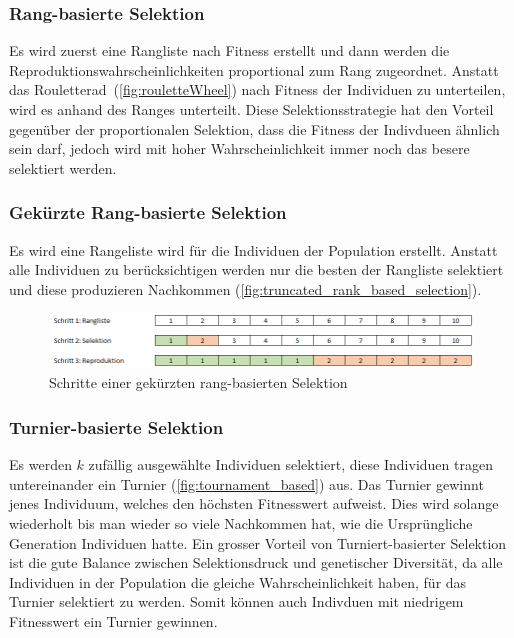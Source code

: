       \subsubsection{Rang-basierte Selektion}

        Es wird zuerst eine Rangliste nach Fitness erstellt und dann werden die Reproduktionswahrscheinlichkeiten proportional zum Rang zugeordnet.
        Anstatt das Rouletterad~(\vref{fig:rouletteWheel}) nach Fitness der Individuen zu unterteilen, wird es anhand des Ranges unterteilt.
        Diese Selektionsstrategie hat den Vorteil gegenüber der proportionalen Selektion,
        dass die Fitness der Indivdueen ähnlich sein darf, jedoch wird mit hoher Wahrscheinlichkeit immer noch das besere selektiert werden.

      \subsubsection{Gekürzte Rang-basierte Selektion}

        Es wird eine Rangeliste wird für die Individuen der Population erstellt.
        Anstatt alle Individuen zu berücksichtigen werden nur die besten der Rangliste selektiert und diese produzieren Nachkommen (\vref{fig:truncated_rank_based_selection}).

        \begin{figure}[H]
          \includegraphics[scale=0.7, center]{graphics/truncated_rank_based_selection}
          \caption{Schritte einer gekürzten rang-basierten Selektion\label{fig:truncated_rank_based_selection}}
        \end{figure}


      \subsubsection{Turnier-basierte Selektion\label{par:Turnier}}

        Es werden \(k\) zufällig ausgewählte Individuen selektiert, diese Individuen tragen untereinander ein Turnier (\vref{fig:tournament_based}) aus.
        Das Turnier gewinnt jenes Individuum, welches den höchsten Fitnesswert aufweist.
        Dies wird solange wiederholt bis man wieder so viele Nachkommen hat,
        wie die Ursprüngliche Generation Individuen hatte.
        Ein grosser Vorteil von Turniert-basierter Selektion ist die gute Balance zwischen
        Selektionsdruck und genetischer Diversität, da alle Individuen in der Population die gleiche Wahrscheinlichkeit haben, für das Turnier selektiert zu werden.
        Somit können auch Indivduen mit niedrigem Fitnesswert ein Turnier gewinnen.

